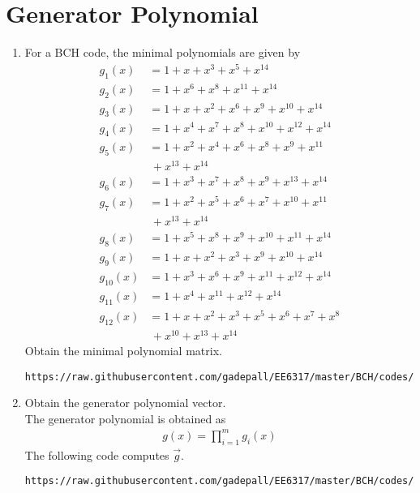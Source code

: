 \documentclass[journal,12pt,twocolumn]{IEEEtran}
\renewcommand\thesection{\arabic{section}}
\begin{document}
\section{Generator Polynomial}
\begin{enumerate}[label=\thesection.\arabic*
,ref=\thesection.\theenumi]
\item For a BCH code, the minimal polynomials are given by 
\begin{align}
g_1(x)&=1+x+x^3+x^5+x^{14}\\
g_2(x)&=1+x^6+x^8+x^{11}+x^{14}\\
g_3(x)&=1+x+x^2+x^6+x^9+x^{10}+x^{14}\\
g_4(x)&=1+x^4+x^7+x^8+x^10+x^{12}+x^{14}\\
g_5(x)&=1+x^2+x^4+x^6+x^8+x^9+x^{11}
\nonumber \\
&\,+x^{13}+x^{14}\\
g_6(x)&=1+x^3+x^7+x^8+x^9+x^{13}+x^{14}\\
g_7(x)&=1+x^2+x^5+x^6+x^7+x^{10}+x^{11}
\nonumber \\
&\,+x^{13}+x^{14}\\
g_8(x)&=1+x^5+x^8+x^9+x^{10}+x^{11}+x^{14}\\
g_9(x)&=1+x+x^2+x^3+x^9+x^{10}+x^{14}\\
g_{10}(x)&=1+x^3+x^6+x^9+x^{11}+x^{12}+x^{14}\\
g_{11}(x)&=1+x^4+x^{11}+x^{12}+x^{14}\\
g_{12}(x)&=1+x+x^2+x^3+x^5+x^6+x^7+x^8
\nonumber \\
&\,+x^{10}+x^{13}+x^{14}
\end{align}
Obtain the minimal polynomial matrix.
\\
\solution
\begin{lstlisting}
https://raw.githubusercontent.com/gadepall/EE6317/master/BCH/codes/min_poly_mat.py
\end{lstlisting}
\item Obtain the generator polynomial vector.
\\
\solution The generator polynomial is obtained as
\begin{align}
g(x) =\prod_{i = 1}^{m}g_i(x)
\end{align}
%
The following code computes $\vec{g}$.
\begin{lstlisting}
https://raw.githubusercontent.com/gadepall/EE6317/master/BCH/codes/gen_poly.py
\end{lstlisting}
\end{enumerate}
\end{document}
